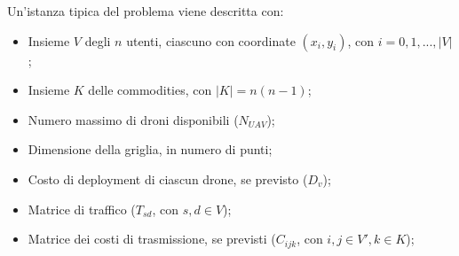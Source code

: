 Un'istanza tipica del problema viene descritta con:
\begin{itemize}  
	\item Insieme $V$ degli $n$ utenti, ciascuno con coordinate $(x_i,y_i)$, con $i = 0,1,...,|V|$;
	\item Insieme $K$ delle commodities, con $|K| = n (n-1)$;
	\item Numero massimo di droni disponibili ($N_{UAV}$);
	\item Dimensione della griglia, in numero di punti;
	\item Costo di deployment di ciascun drone, se previsto ($D_v$); 
	\item Matrice di traffico ($T_{sd}$, con $s,d \in V$);
	\item Matrice dei costi di trasmissione, se previsti ($C_{ijk}$, con $i,j \in V', k \in K$);
\end{itemize}

